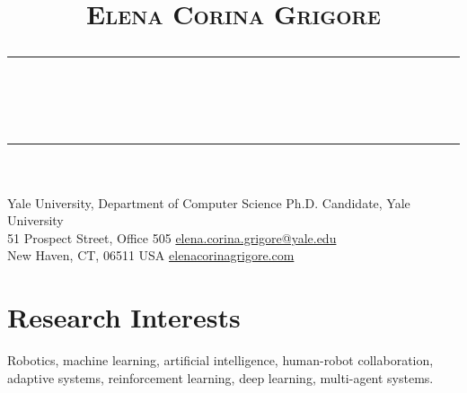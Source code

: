 \documentclass[10pt,letterpaper]{article}
\title{\vspace{-3em}
	\Huge{\textsc{Elena Corina Grigore}}
	\vspace{-0.5em}
	\\\noindent\rule{\linewidth}{0.5pt}
	\vspace{-2.5em}
	\\\noindent\rule{\linewidth}{0.5pt}
	\vspace{-3.2em}
}
\date{}
\begin{document}
\maketitle
\thispagestyle{fancy}

Yale University, Department of Computer Science \hfill Ph.D. Candidate, Yale University\\
51 Prospect Street, Office 505 \hfill \href{mailto:elena.corina.grigore@yale.edu}{elena.corina.grigore@yale.edu}\\
New Haven, CT, 06511 USA \hfill \href{http://elenacorinagrigore.com}{elenacorinagrigore.com}

\vspace{-0.1em}
\section{Research Interests}
\vspace{-0.5em}
Robotics, machine learning, artificial intelligence, human-robot collaboration, adaptive systems, reinforcement learning, deep learning, multi-agent systems.

\vspace{-1em}
\end{document}
